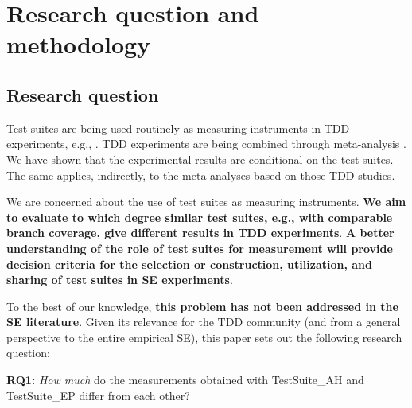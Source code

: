 \section{Research question and methodology}\label{sec:objectives}

\subsection{Research question}\label{sec:questions}

Test suites are being used routinely as measuring instruments in TDD experiments, e.g., \cite{Causevic2012,Desai2009,Erdogmus2005,Fucci2013}. TDD experiments are being combined through meta-analysis \cite{rafique2012effects}. We have shown that the experimental results are conditional on the test suites. The same applies, indirectly, to the meta-analyses based on those TDD studies. 

We are concerned about the use of test suites as measuring instruments. \textbf{We aim to evaluate to which degree similar test suites, e.g., with comparable branch coverage, give different results in TDD experiments}. \textbf{A better understanding of the role of test suites for measurement will provide decision criteria for the selection or construction, utilization, and sharing of test suites in SE experiments}.

To the best of our knowledge, \textbf{this problem has not been addressed in the SE literature}. Given its relevance for the TDD community (and from a general perspective to the entire empirical SE), this paper sets out the following research question:





\vspace{0.8mm}

\textbf{RQ1:} \textit{How much} do the measurements obtained with TestSuite\_AH and TestSuite\_EP differ from each other?

\vspace{0.8mm}


